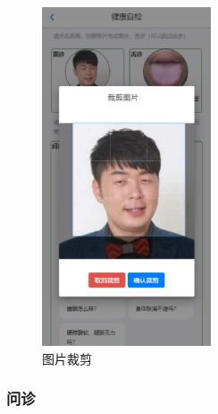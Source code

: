 
\begin{figure}
    \centering
    \includegraphics[height=10cm]{images/crop.png}
    \caption{图片裁剪}
    \label{fig:crop}
\end{figure}

\subsubsection{问诊}

